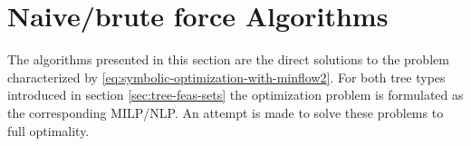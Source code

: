 \section{Naive/brute force Algorithms}
\label{sec:naive}
The algorithms presented in this section are the direct solutions to the problem characterized by \eqref{eq:symbolic-optimization-with-minflow2}. For both tree types introduced in section \ref{sec:tree-feas-sets} the optimization problem is formulated as the corresponding MILP/NLP. An attempt is made to solve these problems to full optimality.


